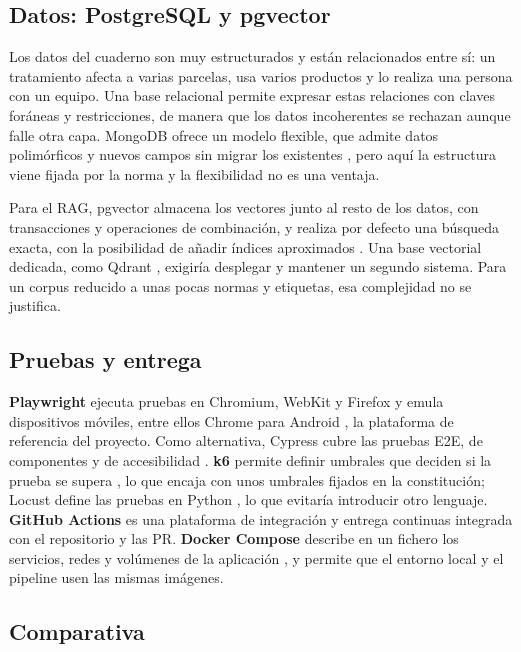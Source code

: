 \subsection{Datos: PostgreSQL y pgvector}\label{subsec:TecDatos}

Los datos del cuaderno son muy estructurados y están relacionados entre sí: un tratamiento afecta a varias parcelas, usa varios productos y lo realiza una persona con un equipo. Una base relacional permite expresar estas relaciones con claves foráneas y restricciones, de manera que los datos incoherentes se rechazan aunque falle otra capa. MongoDB ofrece un modelo flexible, que admite datos polimórficos y nuevos campos sin migrar los existentes \citep{mongodb-modeling}, pero aquí la estructura viene fijada por la norma y la flexibilidad no es una ventaja.

Para el RAG, pgvector almacena los vectores junto al resto de los datos, con transacciones y operaciones de combinación, y realiza por defecto una búsqueda exacta, con la posibilidad de añadir índices aproximados \citep{pgvector}. Una base vectorial dedicada, como Qdrant \citep{qdrant-overview}, exigiría desplegar y mantener un segundo sistema. Para un corpus reducido a unas pocas normas y etiquetas, esa complejidad no se justifica.

\subsection{Pruebas y entrega}\label{subsec:TecPruebas}

\textbf{Playwright} ejecuta pruebas en Chromium, WebKit y Firefox y emula dispositivos móviles, entre ellos Chrome para Android \citep{playwright-intro}, la plataforma de referencia del proyecto. Como alternativa, Cypress cubre las pruebas E2E, de componentes y de accesibilidad \citep{cypress-why}. \textbf{k6} permite definir umbrales que deciden si la prueba se supera \citep{k6-thresholds}, lo que encaja con unos umbrales fijados en la constitución; Locust define las pruebas en Python \citep{locust}, lo que evitaría introducir otro lenguaje. \textbf{GitHub Actions} es una plataforma de integración y entrega continuas \citep{github-actions} integrada con el repositorio y las PR. \textbf{Docker Compose} describe en un fichero los servicios, redes y volúmenes de la aplicación \citep{docker-compose}, y permite que el entorno local y el pipeline usen las mismas imágenes.

\subsection{Comparativa}\label{subsec:ComparativaTecnologias}

